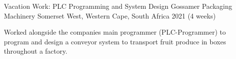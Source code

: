 \begin{cventries}

  \cventry
    {Vacation Work: PLC Programming and System Design} %
    {Gossamer Packaging Machinery} %
    {Somerset West, Western Cape, South Africa} %
    {2021 (4 weeks)} %
    {
      \begin{cvitems} %
        \item {Worked alongside the companies main programmer (PLC-Programmer) to program and design a conveyor system to transport fruit produce in boxes throughout a factory.}
      \end{cvitems}
    }
    


%
%

\end{cventries}
